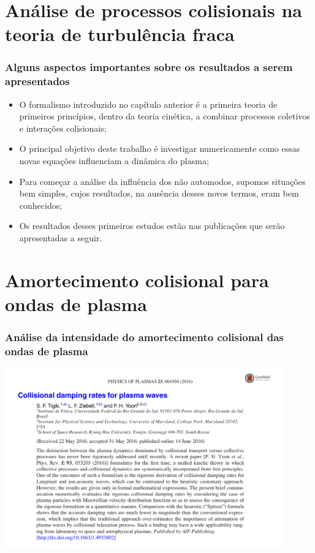 \documentclass[10pt,aspectratio=1610,lualatex]{beamer}
\begin{document}
\section{Análise de processos colisionais na teoria de
  turbulência fraca}
\begin{frame}
  \frametitle{Alguns aspectos importantes sobre os resultados
  a serem apresentados}
  \begin{itemize}
    \item O formalismo introduzido no capítulo anterior é a primeira
    teoria de primeiros princípios, dentro da teoria cinética, a
    combinar processos coletivos e interações colisionais;
    \vspace{0.3cm}
    \pause
    \item O principal objetivo deste trabalho é investigar numericamente
    como essas novas equações influenciam a dinâmica do plasma;
    \vspace{0.3cm}
    \pause 
    \item Para começar a análise da influência dos não automodos,
    supomos situações bem simples, cujos resultados, na ausência desses
    novos termos, eram bem conhecidos;
    \vspace{0.3cm}
    \pause 
    \item Os resultados desses primeiros estudos estão nas
    publicações que serão apresentadas a seguir.
  \end{itemize}
\end{frame}

\section*{Amortecimento colisional para ondas de plasma}
\begin{frame}
  \frametitle{Análise da intensidade do amortecimento colisional das
    ondas de plasma}
 \centering \includegraphics[width=0.9\textwidth]{print_Tigik2016b.png}
\end{frame}
\end{document}
